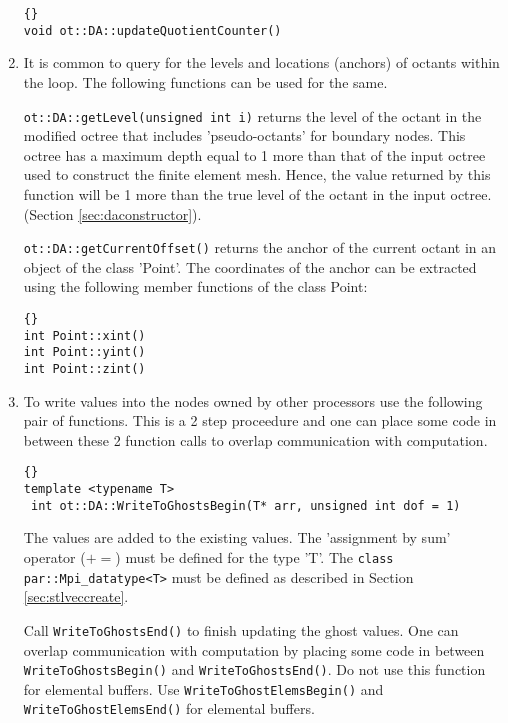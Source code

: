 \documentclass[12pt,reqno,a4paper]{report}
\numberwithin{equation}{section}
\begin{document}
\begin{enumerate}
\begin{lstlisting}[frame=trbl, fontadjust]{}
void ot::DA::updateQuotientCounter()
\end{lstlisting}

\item It is common to query for the levels and locations (anchors) of octants within the loop. The following functions can be used for the same.

\lstinline[basicstyle=\bfseries]!ot::DA::getLevel(unsigned int i)! returns the level of the octant in the modified octree that includes
 'pseudo-octants' for boundary nodes. This octree has a maximum depth equal to 1 more than that of the input octree used to construct the finite element mesh. Hence, the value returned by this function will be 1 more than the true level of the octant in the input octree. (Section \ref{sec:daconstructor}).

\lstinline[basicstyle=\bfseries]!ot::DA::getCurrentOffset()! returns the anchor of the current octant in an object of the class 'Point'. The coordinates of the anchor can be extracted using the following member functions of the class Point:

\begin{lstlisting}[frame=trbl, fontadjust]{}
int Point::xint()
int Point::yint()
int Point::zint()
\end{lstlisting}

\item To write values into the nodes owned by other processors use the following pair of functions. This is a 2 step proceedure
 and one can place some code in between these 2 function calls to overlap communication with computation. 
 
\begin{lstlisting}[frame=trbl, fontadjust]{}
template <typename T>
 int ot::DA::WriteToGhostsBegin(T* arr, unsigned int dof = 1)
\end{lstlisting}

The values are added to the existing values. The 'assignment by sum' operator ($+=$) must be defined for the type 'T'. The 
\lstinline[basicstyle=\bfseries]!class par::Mpi_datatype<T>! must be defined as described in Section \ref{sec:stlveccreate}.

Call \lstinline[basicstyle=\bfseries]!WriteToGhostsEnd()! to finish updating the ghost values.
 One can overlap communication with computation by placing
 some code in between \lstinline[basicstyle=\bfseries]!WriteToGhostsBegin()! and \lstinline[basicstyle=\bfseries]!WriteToGhostsEnd()!.
 Do not use this function for elemental buffers. Use \lstinline[basicstyle=\bfseries]!WriteToGhostElemsBegin()! and \lstinline[basicstyle=\bfseries]!WriteToGhostElemsEnd()! for elemental buffers.


\end{enumerate}
\end{document}

